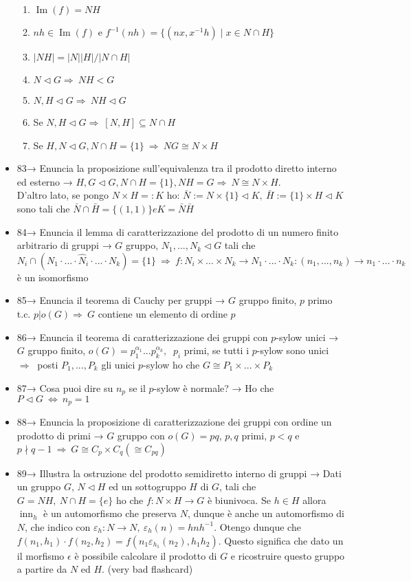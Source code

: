 \documentclass[A4,12pt]{article}
\newcommand{\then}{\Rightarrow}
\renewcommand{\iff}{\Leftrightarrow}
\newcommand{\psy}{$ p $-sylow }
\begin{document}
\begin{itemize}[noitemsep]
\begin{enumerate}[noitemsep]
			\item $\operatorname{Im}(f) = NH  $
			\item $ nh\in \operatorname{Im}(f) $ e $ f^{-1}(nh)=\{(nx,x^{-1}h)\mid x\in N\cap H \} $
			\item $ |NH| = |N||H|/|N\cap H| $
			\item $ N\lhd G\then\ NH<G $
			\item $ N,H\lhd G\then\ NH\lhd G $
			\item Se $ N,H\lhd G\then\ [N,H]\subseteq N\cap H $
			\item Se $ H,N\lhd G, N\cap H = \{1\}\ \then\ NG\cong N\times H $
		\end{enumerate}
		\item 83→ Enuncia la proposizione sull'equivalenza tra il prodotto diretto interno ed esterno → $ H,G\lhd G, N\cap H = \{1\}, NH = G\then\ N\cong N\times H $.\\ D'altro lato, se pongo $ N\times H=: K  $ ho: $ \bar N := N\times \{1\} \lhd K,\ \bar H :=\{1\}\times H\lhd K $ sono tali che $ \bar N \cap \bar H = \{(1,1)\} e K=\bar N \bar H $
		\item 84→ Enuncia il lemma di caratterizzazione del prodotto di un numero finito arbitrario di gruppi → $ G $ gruppo, $ N_1,...,N_k\lhd G $ tali che $ N_i \cap (N_1\cdot ... \cdot \hat N_i \cdot ... \cdot N_k)  = \{1\}\ \then\ f:N_i\times ...\times N_k \to N_1 \cdot ... \cdot N_k : (n_1, ..., n_k)\to n_1\cdot ...\cdot n_k  $ è un isomorfismo
		\item 85→ Enuncia il teorema di Cauchy per gruppi → $ G $ gruppo finito, $  p $ primo t.c. $ p| o(G)\then\ G $ contiene un elemento di ordine $ p $ 
		\item 86→ Enuncia il teorema di caratterizzazione dei gruppi con \psy unici → $ G  $ gruppo finito, $ o(G)= p_1^{\alpha_1}...p_k^{\alpha_k},$  $\ p_i $ primi, se tutti i \psy sono unici $ \then\ $ posti $ P_1,...,P_k $ gli unici \psy ho che $ G \cong P_1\times...\times P_k $
		\item 87→ Cosa puoi dire su $ n_p  $ se il \psy è normale? → Ho che $ P\lhd G\ \iff\ n_p = 1$
		\item 88→ Enuncia la proposizione di caratterizzazione dei gruppi con ordine un prodotto di primi → $ G $ gruppo con $ o(G) = pq $, $p,q$ primi, $ p<q$ e $ p\nmid q-1\ \then\  G\cong C_p\times C_q (\cong C_{pq})$
		\item 89→ Illustra la ostruzione del prodotto semidiretto interno di gruppi → Dati un gruppo $ G $, $ N\lhd H $ ed un sottogruppo $ H $ di $ G $, tali che $ G=NH,\ N\cap H =\{e\}$ ho che $ f:N\times H\to G $ è biunivoca. Se $ h\in H $ allora $ \operatorname{inn}_h $ è un automorfismo che preserva $ N $, dunque è anche un automorfismo di $ N $, che indico con $ \varepsilon_h :N\to N,\ \varepsilon_h(n)=hnh^{-1}$. Otengo dunque che $ f(n_1,h_1)\cdot f(n_2,h_2) = f(n_1\varepsilon_{h_1}(n_2), h_1h_2)$. Questo significa che dato un il morfismo $ \epsilon $ è possibile calcolare il prodotto di $ G $ e ricostruire questo gruppo a partire da $ N $ ed $ H $. (very bad flashcard)

\end{itemize}
\end{document}
